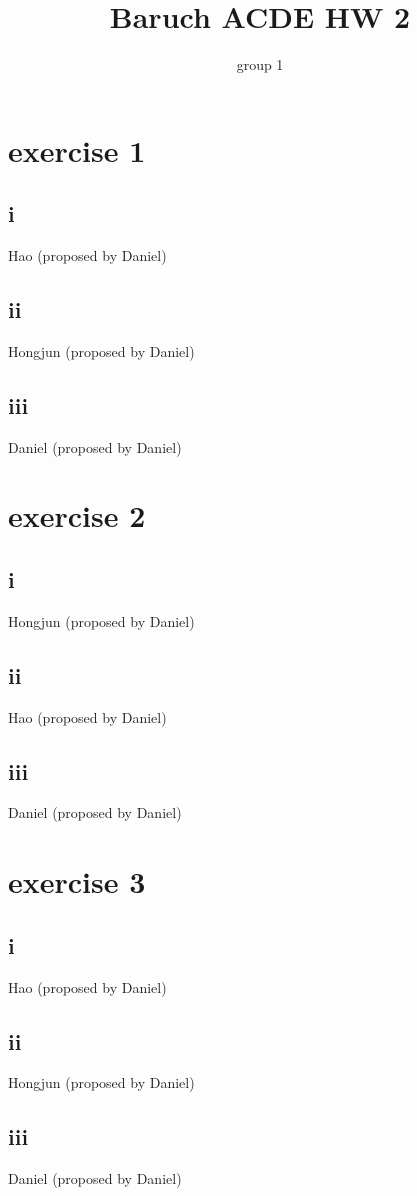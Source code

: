 \documentclass{article}
\title{Baruch ACDE HW 2}
\author{group 1}
\begin{document}
\maketitle
\section*{exercise 1}
\subsection*{i}
Hao (proposed by Daniel)
\subsection*{ii}
Hongjun (proposed by Daniel)
\subsection*{iii}
Daniel (proposed by Daniel)

\section*{exercise 2}
\subsection*{i}

Hongjun (proposed by Daniel)
\subsection*{ii}
Hao (proposed by Daniel)
\subsection*{iii}
Daniel (proposed by Daniel)

\section*{exercise 3}
\subsection*{i}
Hao (proposed by Daniel)
\subsection*{ii}
Hongjun (proposed by Daniel)
\subsection*{iii}
Daniel (proposed by Daniel)
\end{document}

